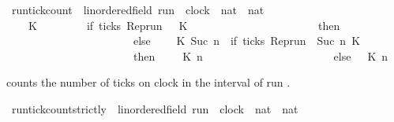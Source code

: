 \begin{isabellebody}
\begin{isamarkuptext}
\end{isamarkuptext}\isamarkuptrue%
\isamarkupfalse%
\ run{\isacharunderscore}tick{\isacharunderscore}count\ {\isacharcolon}{\isacharcolon}\ {\isacartoucheopen}{\isacharparenleft}{\isacharprime}{\isasymtau}{\isacharcolon}{\isacharcolon}linordered{\isacharunderscore}field{\isacharparenright}\ run\ {\isasymRightarrow}\ clock\ {\isasymRightarrow}\ nat\ {\isasymRightarrow}\ nat{\isacartoucheclose}\isanewline
\ \ {\isacharparenleft}{\isacartoucheopen}{\isacharhash}\isactrlsub {\isasymle}\ {\isacharunderscore}\ {\isacharunderscore}\ {\isacharunderscore}{\isacartoucheclose}{\isacharparenright}\isanewline
{}\isanewline
\ \ {\isacartoucheopen}{\isacharparenleft}{\isacharhash}\isactrlsub {\isasymle}\ {\isasymrho}\ K\ {}{\isacharparenright}\ \ \ \ \ \ \ {\isacharequal}\ {\isacharparenleft}if\ ticks\ {\isacharparenleft}{\isacharparenleft}Rep{\isacharunderscore}run\ {\isasymrho}{\isacharparenright}\ {}\ K{\isacharparenright}\isanewline
\ \ \ \ \ \ \ \ \ \ \ \ \ \ \ \ \ \ \ \ \ \ \ then\ {}\isanewline
\ \ \ \ \ \ \ \ \ \ \ \ \ \ \ \ \ \ \ \ \ \ \ else\ {}{\isacharparenright}{\isacartoucheclose}\isanewline
{\isacharbar}\ {\isacartoucheopen}{\isacharparenleft}{\isacharhash}\isactrlsub {\isasymle}\ {\isasymrho}\ K\ {\isacharparenleft}Suc\ n{\isacharparenright}{\isacharparenright}\ {\isacharequal}\ {\isacharparenleft}if\ ticks\ {\isacharparenleft}{\isacharparenleft}Rep{\isacharunderscore}run\ {\isasymrho}{\isacharparenright}\ {\isacharparenleft}Suc\ n{\isacharparenright}\ K{\isacharparenright}\isanewline
\ \ \ \ \ \ \ \ \ \ \ \ \ \ \ \ \ \ \ \ \ \ \ then\ {}\ {\isacharplus}\ {\isacharparenleft}{\isacharhash}\isactrlsub {\isasymle}\ {\isasymrho}\ K\ n{\isacharparenright}\isanewline
\ \ \ \ \ \ \ \ \ \ \ \ \ \ \ \ \ \ \ \ \ \ \ else\ {\isacharparenleft}{\isacharhash}\isactrlsub {\isasymle}\ {\isasymrho}\ K\ n{\isacharparenright}{\isacharparenright}{\isacartoucheclose}%
\begin{isamarkuptext}%
 counts the number of ticks on
  clock  in the interval \isatt{[0{\char`\,}\ n[} of run \isa{{\isasymrho}}.%
\end{isamarkuptext}\isamarkuptrue%
\isamarkupfalse%
\ run{\isacharunderscore}tick{\isacharunderscore}count{\isacharunderscore}strictly\ {\isacharcolon}{\isacharcolon}\ {\isacartoucheopen}{\isacharparenleft}{\isacharprime}{\isasymtau}{\isacharcolon}{\isacharcolon}linordered{\isacharunderscore}field{\isacharparenright}\ run\ {\isasymRightarrow}\ clock\ {\isasymRightarrow}\ nat\ {\isasymRightarrow}\ nat{\isacartoucheclose}\isanewline

\end{isabellebody}
